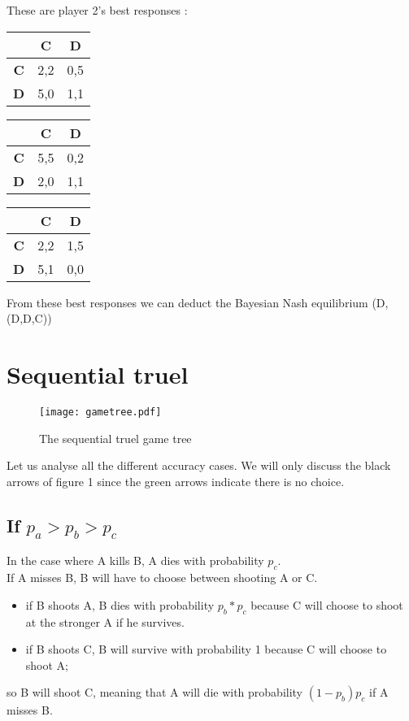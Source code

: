 \documentclass[a4paper]{article}
\begin{document}
These are player 2's best responses :\\
\begin{table}[H]
\begin{tabular}{c|c|c|}
	& \textbf{C} & \textbf{D}\\
	\hline
	\textbf{C} & 2,2 & \cellcolor{red!25} 0,5 \\
	\hline
	\textbf{D} & 5,0 & \cellcolor{red!25} 1,1 \\
\end{tabular}
\hfill
\begin{tabular}{c|c|c|}
	& \textbf{C} & \textbf{D}\\
	\hline
	\textbf{C} & \cellcolor{red!25} 5,5 & 0,2 \\
	\hline
	\textbf{D} & 2,0 & \cellcolor{red!25} 1,1 \\
\end{tabular}
\hfill
\begin{tabular}{c|c|c|}
	& \textbf{C} & \textbf{D}\\
	\hline
	\textbf{C} & 2,2 & \cellcolor{red!25} 1,5 \\
	\hline
	\textbf{D} & \cellcolor{red!25} 5,1 & 0,0 \\
\end{tabular}
\end{table}

From these best responses we can deduct the Bayesian Nash equilibrium
(D,(D,D,C))

\section{Sequential truel}
\begin{figure}[H]
	\texttt{[image: gametree.pdf]}
	\caption{The sequential truel game tree}
\end{figure}

Let us analyse all the different accuracy cases. We will only discuss the black
arrows of figure 1 since the green arrows indicate there is no choice. 

\subsection{If $p_a > p_b > p_c$} In the case where A kills B, A dies with
probability $p_c$.\\

If A misses B, B will have to choose between shooting A or C.
\begin{itemize}
	\item if B shoots A, B dies with probability $p_b*p_c$ because C will
		choose to shoot at the stronger A if he survives.
	\item if B shoots C, B will survive with probability 1 because C will
		choose to shoot A;
\end{itemize}
so B will shoot C, meaning that A will die with probability $(1-p_b)p_c$ if A
misses B.\\
\end{document}
